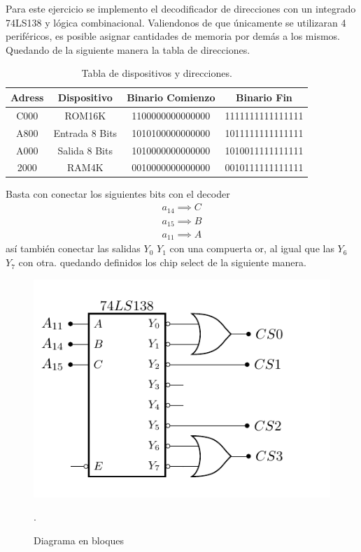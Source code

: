 Para este ejercicio se implemento el decodificador de direcciones con un integrado 74LS138 y lógica combinacional.
Valiendonos de que únicamente se utilizaran 4 periféricos, es posible asignar cantidades de memoria por demás a los mismos.
Quedando de la siguiente manera la tabla de direcciones.
\begin{table}[H]
\centering
\begin{tabular}{cccc}
\hline
\textbf{Adress} & \textbf{Dispositivo} & \textbf{Binario} \textbf{Comienzo} & \textbf{Binario Fin} \\ \hline
C000 & ROM16K & 1100000000000000 & 1111111111111111 \\
A800 & Entrada 8 Bits & 1010100000000000 & 1011111111111111 \\ 
A000 & Salida 8 Bits & 1010000000000000 & 1010011111111111 \\ 
2000 & RAM4K & 0010000000000000 & 0010111111111111 \\ \hline
\end{tabular}
\caption{Tabla de dispositivos y direcciones.}
\end{table}
Basta con conectar los siguientes bits con el decoder
\begin{align}
a_{14} \implies C\\
a_{15} \implies B\\
a_{11} \implies A
\end{align}
así también conectar las salidas $Y_0$ $Y_1$  con una compuerta or, al igual que las $Y_6$ $Y_7$ con otra.
quedando definidos los chip select de la siguiente manera.

\begin{figure}[H]
  \centering
  \includegraphics[width=.6\textwidth, page = 1]{ImagenesEjercicio2/Circuits.pdf}
  \caption{Diagrama en bloques}.
  \label{fig:fotofea}
\end{figure}